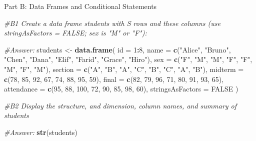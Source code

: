 \documentclass[
]{article}
\newenvironment{Shaded}{\begin{snugshade}}{\end{snugshade}}
\newcommand{\AttributeTok}[1]{\textcolor[rgb]{0.13,0.29,0.53}{#1}}
\newcommand{\CommentTok}[1]{\textcolor[rgb]{0.56,0.35,0.01}{\textit{#1}}}
\newcommand{\ConstantTok}[1]{\textcolor[rgb]{0.56,0.35,0.01}{#1}}
\newcommand{\DecValTok}[1]{\textcolor[rgb]{0.00,0.00,0.81}{#1}}
\newcommand{\FunctionTok}[1]{\textcolor[rgb]{0.13,0.29,0.53}{\textbf{#1}}}
\newcommand{\NormalTok}[1]{#1}
\newcommand{\OtherTok}[1]{\textcolor[rgb]{0.56,0.35,0.01}{#1}}
\newcommand{\SpecialCharTok}[1]{\textcolor[rgb]{0.81,0.36,0.00}{\textbf{#1}}}
\newcommand{\StringTok}[1]{\textcolor[rgb]{0.31,0.60,0.02}{#1}}
\begin{document}
Part B: Data Frames and Conditional Statements

\begin{Shaded}
\begin{Highlighting}[]
\CommentTok{\#B1 Create a data frame students with S rows and these columns (use stringAsFactors = FALSE; sex is "M" or "F"):}

\CommentTok{\#Answer: }
\NormalTok{students }\OtherTok{\textless{}{-}} \FunctionTok{data.frame}\NormalTok{(}
  \AttributeTok{id =} \DecValTok{1}\SpecialCharTok{:}\DecValTok{8}\NormalTok{,}
  \AttributeTok{name =} \FunctionTok{c}\NormalTok{(}\StringTok{"Alice"}\NormalTok{, }\StringTok{"Bruno"}\NormalTok{, }\StringTok{"Chen"}\NormalTok{, }\StringTok{"Dana"}\NormalTok{,}
           \StringTok{"Elif"}\NormalTok{, }\StringTok{"Farid"}\NormalTok{, }\StringTok{"Grace"}\NormalTok{, }\StringTok{"Hiro"}\NormalTok{),}
  \AttributeTok{sex =} \FunctionTok{c}\NormalTok{(}\StringTok{"F"}\NormalTok{, }\StringTok{"M"}\NormalTok{, }\StringTok{"M"}\NormalTok{, }\StringTok{"F"}\NormalTok{, }\StringTok{"F"}\NormalTok{, }\StringTok{"M"}\NormalTok{, }\StringTok{"F"}\NormalTok{, }\StringTok{"M"}\NormalTok{),}
  \AttributeTok{section =} \FunctionTok{c}\NormalTok{(}\StringTok{"A"}\NormalTok{, }\StringTok{"B"}\NormalTok{, }\StringTok{"A"}\NormalTok{, }\StringTok{"C"}\NormalTok{, }\StringTok{"B"}\NormalTok{, }\StringTok{"C"}\NormalTok{, }\StringTok{"A"}\NormalTok{, }\StringTok{"B"}\NormalTok{),}
  \AttributeTok{midterm =} \FunctionTok{c}\NormalTok{(}\DecValTok{78}\NormalTok{, }\DecValTok{85}\NormalTok{, }\DecValTok{92}\NormalTok{, }\DecValTok{67}\NormalTok{, }\DecValTok{74}\NormalTok{, }\DecValTok{88}\NormalTok{, }\DecValTok{95}\NormalTok{, }\DecValTok{59}\NormalTok{),}
  \AttributeTok{final =} \FunctionTok{c}\NormalTok{(}\DecValTok{82}\NormalTok{, }\DecValTok{79}\NormalTok{, }\DecValTok{96}\NormalTok{, }\DecValTok{71}\NormalTok{, }\DecValTok{80}\NormalTok{, }\DecValTok{91}\NormalTok{, }\DecValTok{93}\NormalTok{, }\DecValTok{65}\NormalTok{),}
  \AttributeTok{attendance =} \FunctionTok{c}\NormalTok{(}\DecValTok{95}\NormalTok{, }\DecValTok{88}\NormalTok{, }\DecValTok{100}\NormalTok{, }\DecValTok{72}\NormalTok{, }\DecValTok{90}\NormalTok{, }\DecValTok{85}\NormalTok{, }\DecValTok{98}\NormalTok{, }\DecValTok{60}\NormalTok{),}
  \AttributeTok{stringsAsFactors =} \ConstantTok{FALSE}
\NormalTok{)}
\end{Highlighting}
\end{Shaded}

\begin{Shaded}
\begin{Highlighting}[]
\CommentTok{\#B2 Display the structure, and dimension, column names, and summary of students}

\CommentTok{\#Answer:}
\FunctionTok{str}\NormalTok{(students)}
\end{Highlighting}
\end{Shaded}
\end{document}
